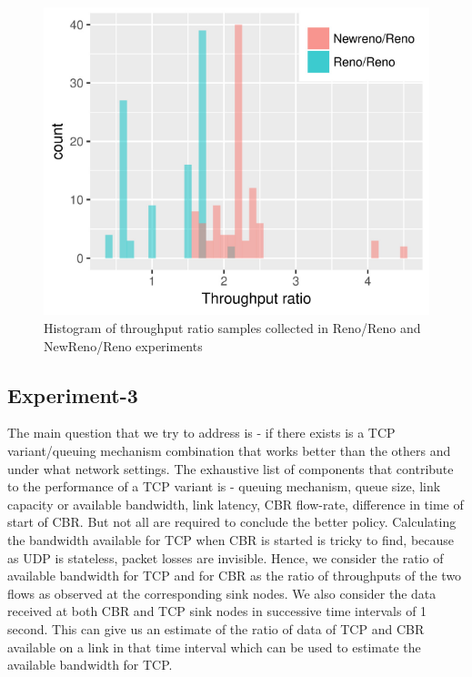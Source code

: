 \documentclass[USenglish,oneside,twocolumn]{article}
\begin{document}
\begin{figure}
	\centering
	\includegraphics[width=\linewidth]{fig/experiment2/throughput_ratio.pdf}
	\captionsetup{justification=centering}
	\caption{Histogram of throughput ratio samples collected in Reno/Reno and NewReno/Reno experiments}
	\label{ratio histogram}
\end{figure}


\subsection{Experiment-3}
The main question that we try to address is - if there exists is a TCP variant/queuing mechanism combination that works better than the others and under what network settings. The exhaustive list of components that contribute to the performance of a TCP variant is - queuing mechanism, queue size, link capacity or available bandwidth, link latency, CBR flow-rate, difference in time of start of CBR. But not all are required to conclude the better policy. Calculating the bandwidth available for TCP when CBR is started is tricky to find, because as UDP is stateless, packet losses are invisible. Hence, we consider the ratio of available bandwidth for TCP and for CBR as the ratio of throughputs of the two flows as observed at the corresponding sink nodes. We also consider the data received at both CBR and TCP sink nodes in successive time intervals of 1 second. This can give us an estimate of the ratio of data of TCP and CBR available on a link in that time interval which can be used to estimate the available bandwidth for TCP.\\
\end{document}
